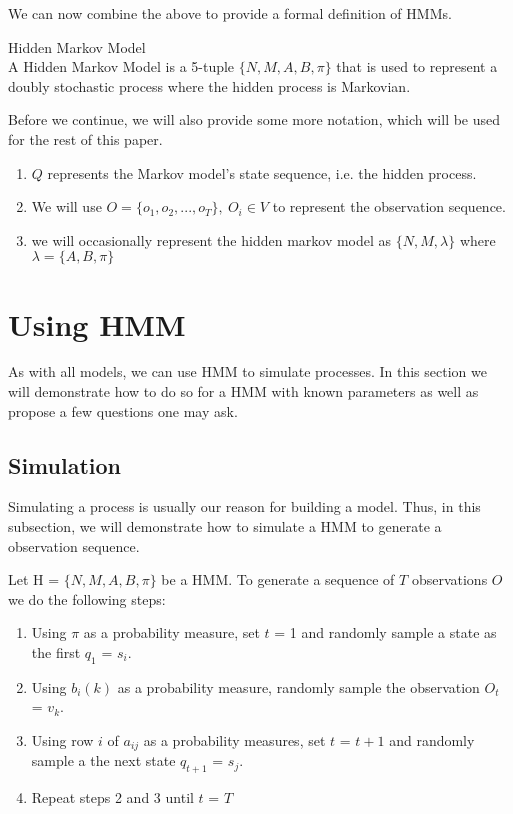We can now combine the above to provide a formal definition of HMMs.

\begin{definition}
    \label{Definition:HMM} Hidden Markov Model \\
    A Hidden Markov Model is a 5-tuple $\{N,M,A,B,\pi \}$ that is used to represent a doubly stochastic process where the hidden process is Markovian. 
\end{definition}

Before we continue, we will also provide some more notation, which will be used for the rest of this paper.
\begin{enumerate}[i]
    \item $Q$ represents the Markov model's state sequence, i.e. the hidden process.
    \item We will use $O = \{o_1,o_2,...,o_T\} ,\ O_i \in V$ to represent the observation sequence.
    \item we will occasionally represent the hidden markov model as $\{N,M, \lambda \}$ where $\lambda = \{A, B, \pi\}$ 
\end{enumerate}


\section{Using HMM}
\label{Hidden_Markov:Using_HMM}

As with all models, we can use HMM to simulate processes. In this section we will demonstrate how to do so for a HMM with known parameters as well as propose a few questions one may ask.

    \subsection{Simulation}
    \label{Hidden_Markov:Using_HMM:Simulation}

    Simulating a process is usually our reason for building a model.   Thus, in this subsection, we will demonstrate how to simulate a HMM to generate a observation sequence.

    Let H = $\{N,M,A,B,\pi\}$ be a HMM. To generate a sequence of $T$ observations $O$ we do the following steps:
     \begin{enumerate}
        \label{Hidden_Markov:Using_HMM:Simulation:Method}
         \item Using $\pi$ as a probability measure, set $t$ = 1 and    randomly sample a state as the first $q_1$ = $s_i$.
         \item Using $b_i(k)$ as a probability measure, randomly sample the observation $O_t$ = $v_k$.
         \item Using row $i$ of $a_{ij}$ as a probability measures, set $t$ = $t+1$    and randomly sample a the next state $q_{t+1}$ = $s_j$.
         \item Repeat steps 2 and 3 until $t$ = $T$
     \end{enumerate}


